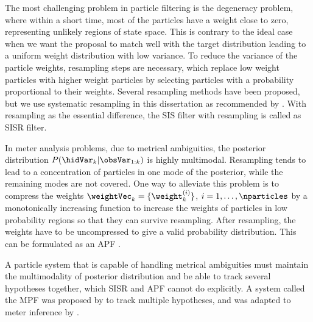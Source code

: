 The most challenging problem in particle filtering is the degeneracy problem, where within a short time, most of the particles have a weight close to zero, representing unlikely regions of state space. This is contrary to the ideal case when we want the proposal to match well with the target distribution leading to a uniform weight distribution with low variance. To reduce the variance of the particle weights, resampling steps are necessary, which replace low weight particles with higher weight particles by selecting particles with a probability proportional to their weights. Several resampling methods have been proposed, but we use systematic resampling in this dissertation as recommended by . With resampling as the essential difference, the \gls{SIS} filter with resampling is called as \gls{SISR} filter. 

In meter analysis problems, due to metrical ambiguities, the posterior distribution $P(\hidVar_k | \obsVar_{1:k})$ is highly multimodal. Resampling tends to lead to a concentration of particles in one mode of the posterior, while the remaining modes are not covered. One way to alleviate this problem is to compress the weights $\weightVec_k = \{\weight^{(i)}_k\}$, $i = 1,\ldots, \nparticles$ by a monotonically increasing function to increase the weights of particles in low probability regions so that they can survive resampling. After resampling, the weights have to be uncompressed to give a valid probability distribution. This can be formulated as an \gls{APF} \cite{johansen:08:auxpf}.

A particle system that is capable of handling metrical ambiguities must maintain the multimodality of posterior distribution and be able to track several hypotheses together, which \gls{SISR} and \gls{APF} cannot do explicitly. A system called the \gls{MPF} was proposed by  to track multiple hypotheses, and was adapted to meter inference by . 

